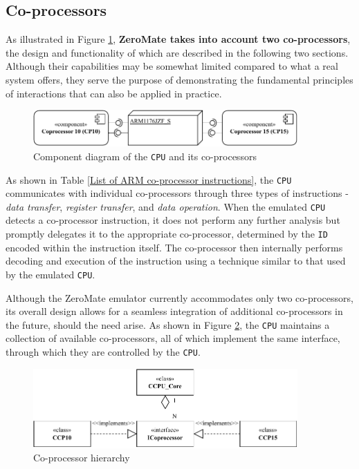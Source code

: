 \documentclass[english, ing, kiv, he, iso690numb, pdf]{fasthesis}
\begin{document}
	
	\subsection{Co-processors}
	
	As illustrated in Figure \ref{Component diagram of the CPU and its co-processors}, \textbf{ZeroMate takes into account two co-processors}, the design and functionality of which are described in the following two sections. Although their capabilities may be somewhat limited compared to what a real system offers, they serve the purpose of demonstrating the fundamental principles of interactions that can also be applied in practice.
	
	\begin{figure}[ht]
		\centering
		\includegraphics[width=0.9\textwidth]{img/diagrams/coprocessors.pdf}
		\caption{Component diagram of the \texttt{CPU} and its co-processors}
		\label{Component diagram of the CPU and its co-processors}
	\end{figure}
	
	\newpage
	
	As shown in Table \ref{List of ARM co-processor instructions}, the \texttt{CPU} communicates with individual co-processors through three types of instructions - \textit{data transfer}, \textit{register transfer}, and \textit{data operation}. When the emulated \texttt{CPU} detects a co-processor instruction, it does not perform any further analysis but promptly delegates it to the appropriate co-processor, determined by the \texttt{ID} encoded within the instruction itself. The co-processor then internally performs decoding and execution of the instruction using a technique similar to that used by the emulated \texttt{CPU}.
	
	Although the ZeroMate emulator currently accommodates only two co-processors, its overall design allows for a seamless integration of additional co-processors in the future, should the need arise. As shown in Figure \ref{Co-processor hierarchy}, the \texttt{CPU} maintains a collection of available co-processors, all of which implement the same interface, through which they are controlled by the \texttt{CPU}.
	
	\begin{figure}[ht]
		\centering
		\includegraphics[width=0.9\textwidth]{img/diagrams/coprocessors_2.pdf}
		\caption{Co-processor hierarchy}
		\label{Co-processor hierarchy}
	\end{figure}
	
\end{document}
